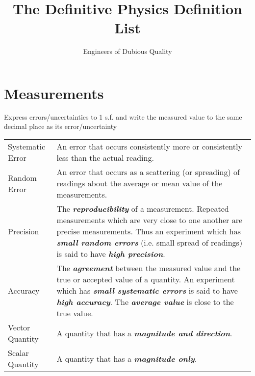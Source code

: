 \documentclass[a4paper]{article}
\title{The Definitive Physics Definition List}
\author{Engineers of Dubious Quality}
\begin{document}
	
	\maketitle
	
	\section{Measurements}
	Express errors/uncertainties to 1 s.f. and write the measured value to the same decimal place as its error/uncertainty
	
	\begin{center}
		\renewcommand{\arraystretch}{1.2}
		\begin{tabular}{@{} l p{10.5cm} @{}}
			\toprule
			Systematic Error & An error that occurs consistently more or consistently less than the actual reading.\\
			Random Error & An error that occurs as a scattering (or spreading) of readings about the average or mean value of the measurements. \\
			\midrule
			Precision & The \textit{\textbf{reproducibility}} of a measurement. Repeated measurements which are very close to one another are precise measurements. Thus an experiment which has \textit{\textbf{small random errors}} (i.e. small spread of readings) is said to have \textit{\textbf{high precision}}. \\
			Accuracy & The \textbf{\textit{agreement}} between the measured value and the true or accepted value of a quantity. An experiment which has \textbf{\textit{small systematic errors}} is said to have \textbf{\textit{high accuracy}}. The \textbf{\textit{average value}} is close to the true value. \\
			\midrule
			Vector Quantity & A quantity that has a \textbf{\textit{magnitude and direction}}. \\
			Scalar Quantity & A quantity that has a \textbf{\textit{magnitude only}}. \\
			\bottomrule
		\end{tabular}
	\end{center}
	
\end{document}
